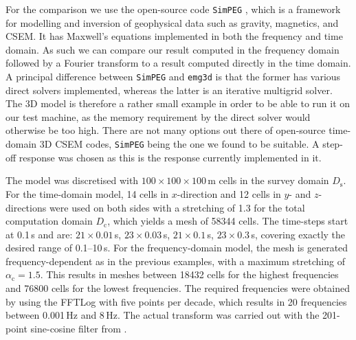 \documentclass[extra, camera,%
    onecolumn,   %
    referee,     %
]{gji}
\newcommand{\mr}[1]{\mathrm{#1}}
\newcommand{\emg}[2]{\texttt{emg#1#2}\xspace}
\newcommand{\simpeg}{\texttt{SimPEG}\xspace}
\begin{document}
For the comparison\added{,} we use the open-source code \simpeg
\citep{CAG.15.Cockett}, which is a framework for modelling and inversion of
geophysical data such as gravity, magnetics, and CSEM. It has Maxwell's
equations implemented in both the frequency and time domain. As such we can
compare our result computed in the frequency domain followed by a Fourier
transform to a result computed directly in the time domain. A principal
difference between \simpeg and \emg3d is that the former has various direct
solvers implemented, whereas the latter is an iterative multigrid solver. The
3D model is therefore a rather small example in order to be able to run it on
our test machine, as the memory requirement by the direct solver would
otherwise be too high. There are not many options out there of open-source
time-domain 3D CSEM codes, \simpeg being the one we found to be suitable. A
step-off response was chosen as this is the response currently implemented in
it.

The model was discretised with $100\times100\times100\,$m cells in the survey
domain $D_\mr{s}$. For the time-domain model, 14 cells in $x$-direction and 12
cells in $y$- and $z$-directions were used on both sides with a stretching of
1.3 for the total computation domain $D_\mr{c}$, which yields a mesh of
\num{58344} cells. The time-steps start at 0.1\,s and are: $21\times0.01\,$s,
$23\times0.03\,$s, $21\times0.1\,$s, $23\times0.3\,$s, covering exactly the
desired range of 0.1--10\,s. For the frequency-domain model, the mesh is
generated frequency-dependent as in the previous examples, with a maximum
stretching of $\alpha_\mr{c}=1.5$. This results in meshes between \num{18432}
cells for the highest frequencies and \num{76800} cells for the lowest
frequencies. The required frequencies were obtained by using the FFTLog with
five points per decade, which results in 20 frequencies between 0.001\,Hz and
8\,Hz. The actual transform was carried out with the 201-point sine-cosine
filter from \cite{GEO.09.Key}.
\end{document}
